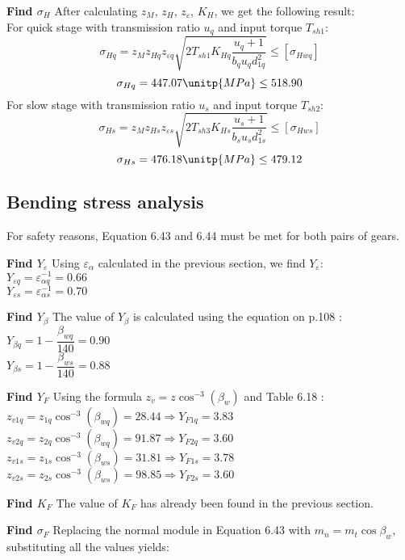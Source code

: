\textbf{Find $ \sigma_H $} After calculating $ z_M $, $ z_H $, $ z_\varepsilon $, $ K_H $, we get the following result:\\
For quick stage with transmission ratio $ u_q $ and input torque $ T_{sh1} $:
\[
\sigma_{Hq} = z_Mz_{Hq}z_{\varepsilon q}\sqrt{2T_{sh1}K_{Hq}\dfrac{u_q+1}{b_qu_qd_{1q}^2}} \leq [{\sigma}_{Hwq}]
\]
\[\sigma_{Hq} = 447.07 \unitp{MPa}\leq 518.90 \] 
For slow stage with transmission ratio $ u_s $ and input torque $ T_{sh2} $:
\[
\sigma_{Hs} = z_Mz_{Hs}z_{\varepsilon s}\sqrt{2T_{sh3}K_{Hs}\dfrac{u_s+1}{b_su_sd_{1s}^2}} \leq [{\sigma}_{Hws}]
\]
\[\sigma_{Hs} = 476.18 \unitp{MPa}\leq 479.12 \] 
\subsection{Bending stress analysis}
For safety reasons, Equation 6.43 and 6.44 \cite{tk1} must be met for both pairs of gears.

\textbf{Find $ Y_\varepsilon $} Using $ \varepsilon_\alpha $ calculated in the previous section, we find $ Y_\varepsilon$:\\
$ Y_{\varepsilon q}= \varepsilon_{\alpha q}^{-1} = 0.66 $\\
$ Y_{\varepsilon s}= \varepsilon_{\alpha s}^{-1} = 0.70 $

\textbf{Find $ Y_\beta $} The value of $ Y_\beta $ is calculated using the equation on p.108 \cite{tk1}:\\
$ Y_{\beta q} = 1-\dfrac{\beta_{wq}}{140}= 0.90$\\
$ Y_{\beta s} = 1-\dfrac{\beta_{ws}}{140}= 0.88$

\textbf{Find $ Y_F $} Using the formula $ z_v = z\cos^{-3}(\beta_w) $ and Table 6.18 \cite{tk1}:\\
$ z_{v1q} = z_{1q}\cos^{-3}(\beta_{wq}) = 28.44\Rightarrow Y_{F1q} = 3.83 $\\
$ z_{v2q} = z_{2q}\cos^{-3}(\beta_{wq}) = 91.87\Rightarrow Y_{F2q} = 3.60 $\\
$ z_{v1s} = z_{1s}\cos^{-3}(\beta_{ws}) = 31.81\Rightarrow Y_{F1s} = 3.78 $\\
$ z_{v2s} = z_{2s}\cos^{-3}(\beta_{ws}) = 98.85\Rightarrow Y_{F2s} = 3.60 $

\textbf{Find $ K_F $} The value of $ K_F $ has already been found in the previous section.

\textbf{Find $ \sigma_F $} Replacing the normal module in Equation 6.43 \cite{tk1} with $ m_n = m_t\cos\beta_w $, substituting all the values yields:

